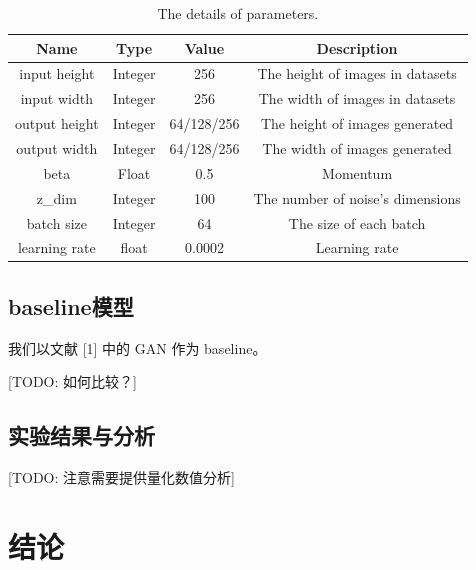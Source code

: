 \documentclass{article}
\begin{document}
\begin{CJK*}{UTF8}{gbsn}
   	\begin{table}[!h]
   		\label{table_parameters}
   		\begin{center}
   			\begin{tabular}{|c|c|c|c|}
   				\hline
   				Name	               & 	Type	&		Value		& 		Description \\
   				\hline
   				input height           &	Integer	&       256         &       The height of images in datasets    \\
   				\hline
   				input width            &	Integer	&       256         &       The width of images in datasets    \\
   				\hline
   				output height          &	Integer	&       64/128/256  &       The height of images generated    \\
   				\hline
   				output width           &	Integer	&       64/128/256  &       The width of images generated    \\
   				\hline
   				beta                   &	Float	&       0.5         &       Momentum    \\
   				\hline
   				z\_dim                 &	Integer	&       100         &       The number of noise's dimensions    \\
   				\hline
   				batch size             &	Integer	&       64          &       The size of each batch    \\
   				\hline
   				learning rate          &	float	&       0.0002      &       Learning rate    \\
   				\hline
   			\end{tabular}
   			\vspace{10pt}
   			\caption{The details of parameters.}
   		\end{center}
   	\end{table}

  \subsection{baseline模型}

	我们以文献 [1] 中的 GAN 作为 baseline。
	
	[TODO: 如何比较？]  

  \subsection{实验结果与分析}

	
  [TODO: 注意需要提供量化数值分析]

\section{结论}


\end{CJK*}
\end{document}

